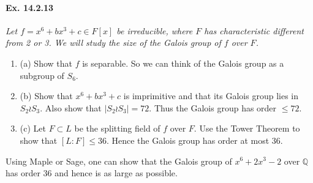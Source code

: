 \documentclass[11pt,a4paper]{article}
\newcommand{\be} {\begin{enumerate}}
\newcommand{\ee} {\end{enumerate}}
\newcommand{\Q}{\mathbb{Q}}
\begin{document}
\paragraph{Ex. 14.2.13}{\it Let $f = x^6 + bx^3 + c \in F[x]$ be irreducible, where $F$ has characteristic different from 2 or 3. We will study the size of the Galois group of $f$ over $F$.
\be
\item[(a)] Show that $f$ is separable. So we can think of the Galois group as a subgroup of $S_6$.
\item[(b)] Show that $x^6+bx^3 + c$ is imprimitive and that its Galois group lies in $S_2 \wr S_3$. Also show that $|S_2 \wr S_3| = 72$. Thus the Galois group has order $\leq 72$.
\item[(c)] Let $F \subset L $ be the splitting field of $f$ over $F$. Use the Tower Theorem to show that $[L:F] \leq 36$. Hence the Galois group has order at most $36$.
\ee
Using Maple or Sage, one can show that the Galois group of $x^6 + 2x^3 - 2$ over $\Q$ has order $36$ and hence is as large as possible.
}
\end{document}
